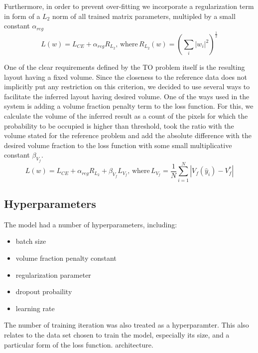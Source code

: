 Furthermore, in order to prevent over-fitting we incorporate a regularization term in form of a $L_{2}$ norm of all trained matrix parameters, multipled by a small constant $\alpha_{reg}$
\begin{equation}
 	L(w) = L_{CE} + \alpha_{reg} R_{L_{2}}, \, \mathrm{where} \, R_{L_{2}}(w) = ( \sum_{i}^{} |w_{i}|^{2} )^{\frac{1}{2}} 
\end{equation}
\medskip

One of the clear requirements defined by the TO problem itself is the resulting layout having a fixed volume. 
Since the closeness to the reference data does not implicitly put any restriction on this criterion, we decided to use several ways to facilitate the inferred layout having desired volume.
One of the ways used in the system is adding a volume fraction penalty term to the loss function.
For this, we calculate the volume of the inferred result as a count of the pixels for which the probability to be occupied is higher than threshold, took the ratio with the volume stated for the reference problem and add the absolute difference with the desired volume fraction to the loss function with some small multiplicative constant $\beta_{V_{f}}$.
\begin{equation}
	L(w) = L_{CE} + \alpha_{reg} R_{L_{2}} + \beta_{V_{f}}  L_{V_{f}} , \, \mathrm{where} \, L_{V_{f}} = \frac{1}{N} \sum_{i=1}^{N} |V_{f}(\hat{y}_{i}) - V_{f}^{\ast}|
\end{equation}


\subsection{Hyperparameters}

The model had a number of hyperparameters, including:
\begin{itemize}
	\item batch size
	\item volume fraction penalty constant
	\item regularization parameter
	\item dropout probaility 
	\item learning rate
\end{itemize}

The number of training iteration was also treated as a hyperparamter.
This also relates to the data set chosen to train the model, especially its size, and a particular form of the loss function.
architecture.
\medskip

